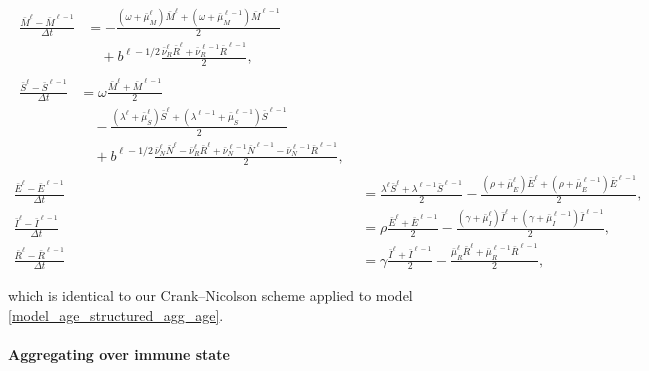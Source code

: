 \documentclass{jpmarticle}
\let\subequationsorig\subequations%
\let\endsubequationsorig\endsubequations%
\renewenvironment{subequations}{
  \subequationsorig
  \renewcommand{\theequation}{\theparentequation.\arabic{equation}}
}{
  \endsubequationsorig
}
\begin{document}
\begin{subequations}
  \label{numerics_age_structured_agg_age}
  \begin{align}
    \begin{split}
      \frac{\bar{M}^{\ell} - \bar{M}^{\ell - 1}}{\Delta t}
      &= - \frac{(\omega + \bar{\mu}_M^{\ell}) \bar{M}^{\ell}
        + (\omega + \bar{\mu}_M^{\ell - 1}) \bar{M}^{\ell - 1}}{2}
      \\ & \quad {}
      + b^{\ell - 1 / 2}
      \frac{\bar{\nu}_R^{\ell} \bar{R}^{\ell}
        + \bar{\nu}_R^{\ell - 1} \bar{R}^{\ell - 1}}{2},
    \end{split}
    \\
    \begin{split}
      \frac{\bar{S}^{\ell} - \bar{S}^{\ell - 1}}{\Delta t}
      &= \omega \frac{\bar{M}^{\ell} + \bar{M}^{\ell - 1}}{2}
      \\ & \quad {}
      - \frac{(\lambda^{\ell} + \bar{\mu}_S^{\ell}) \bar{S}^{\ell}
        + (\lambda^{\ell - 1} + \bar{\mu}_S^{\ell - 1}) \bar{S}^{\ell - 1}}{2}
      \\ & \quad {}
      + b^{\ell - 1 / 2}
      \frac{\bar{\nu}_N^{\ell} \bar{N}^{\ell}
        - \bar{\nu}_R^{\ell} \bar{R}^{\ell}
        + \bar{\nu}_N^{\ell - 1} \bar{N}^{\ell - 1}
        - \bar{\nu}_N^{\ell - 1} \bar{R}^{\ell - 1}}{2},
    \end{split}
    \\
    \frac{\bar{E}^{\ell} - \bar{E}^{\ell - 1}}{\Delta t}
    &= \frac{\lambda^{\ell} \bar{S}^{\ell}
      + \lambda^{\ell - 1} \bar{S}^{\ell - 1}}{2}
    - \frac{(\rho + \bar{\mu}_E^{\ell}) \bar{E}^{\ell}
      + (\rho + \bar{\mu}_E^{\ell - 1}) \bar{E}^{\ell - 1}}{2},
    \\
    \frac{\bar{I}^{\ell} - \bar{I}^{\ell - 1}}{\Delta t}
    &= \rho \frac{\bar{E}^{\ell} + \bar{E}^{\ell - 1}}{2}
    - \frac{(\gamma + \bar{\mu}_I^{\ell}) \bar{I}^{\ell}
      + (\gamma + \bar{\mu}_I^{\ell - 1}) \bar{I}^{\ell - 1}}{2},
    \\
    \frac{\bar{R}^{\ell} - \bar{R}^{\ell - 1}}{\Delta t}
    &= \gamma \frac{\bar{I}^{\ell} + \bar{I}^{\ell - 1}}{2}
    - \frac{\bar{\mu}_R^{\ell} \bar{R}^{\ell}
      + \bar{\mu}_R^{\ell - 1} \bar{R}^{\ell - 1}}{2},
  \end{align}
\end{subequations}
which is identical to our Crank--Nicolson scheme applied to model
\eqref{model_age_structured_agg_age}.


\paragraph{Aggregating over immune state}
\end{document}
